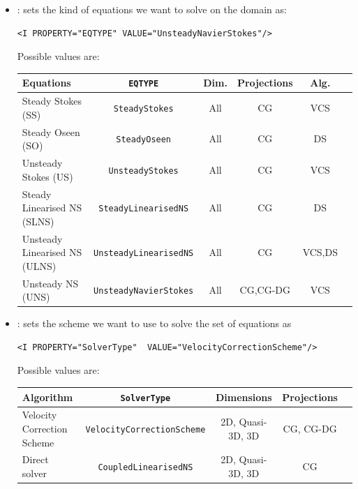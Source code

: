\begin{itemize}
\item {}: sets the kind of equations we want to solve on the domain
as:

\begin{lstlisting}[style=XMLStyle]
<I PROPERTY="EQTYPE" VALUE="UnsteadyNavierStokes"/>
\end{lstlisting}

Possible values are:
\begin{center}
\footnotesize
\renewcommand\arraystretch{1.2}
\begin{tabular}{lccccc}
\toprule
{Equations} & {\texttt{EQTYPE}} &{Dim.}&{Projections} & Alg.\\
\midrule
Steady Stokes (SS)& \texttt{SteadyStokes} & All & CG &VCS \\
Steady Oseen (SO) & \texttt{SteadyOseen} & All & CG& DS \\
Unsteady Stokes (US) & \texttt{UnsteadyStokes} & All & CG &VCS \\
Steady Linearised NS (SLNS) & \texttt{SteadyLinearisedNS} & All & CG & DS \\
Unsteady Linearised NS (ULNS) & \texttt{UnsteadyLinearisedNS} & All & CG & VCS,DS \\
Unsteady NS (UNS) & \texttt{UnsteadyNavierStokes} & All & CG,CG-DG & VCS \\
\bottomrule
\end{tabular}
\end{center}


\item {}: sets the scheme we want to use to solve the set of
equations as
\begin{lstlisting}[style=XMLStyle]
<I PROPERTY="SolverType"  VALUE="VelocityCorrectionScheme"/>
\end{lstlisting}

Possible values are:
\begin{center}
\footnotesize
\begin{tabular}{lcccc}
\toprule
{Algorithm} & {\texttt{SolverType}} &{Dimensions}&{Projections} \\
\midrule
Velocity Correction Scheme & \texttt{VelocityCorrectionScheme} & 2D, Quasi-3D, 3D & CG, CG-DG\\
Direct solver & \texttt{CoupledLinearisedNS} & 2D, Quasi-3D, 3D &CG\\
\bottomrule
\end{tabular}
\end{center}


\end{itemize}
